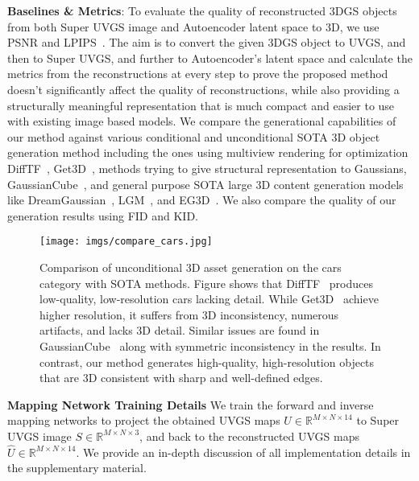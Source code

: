 \vspace{-0.1cm}
\noindent\textbf{Baselines \& Metrics}: 
To evaluate the quality of reconstructed 3DGS objects from both Super UVGS image and Autoencoder latent space to 3D, we use PSNR and LPIPS~\cite{lpips2018}. 
The aim is to convert the given 3DGS object to UVGS, and then to Super UVGS, and further to Autoencoder's latent space and calculate the metrics from the reconstructions at every step to prove the proposed method doesn't significantly affect the quality of reconstructions, while also providing a structurally meaningful representation that is much compact and easier to use with existing image based models. 
%
We compare the generational capabilities of our method against various conditional and unconditional SOTA 3D object generation method including the ones using multiview rendering for optimization DiffTF~\cite{difftf2023}, Get3D~\cite{get3d2022}, methods trying to give structural representation to Gaussians, GaussianCube~\cite{gaussiancube2024}, and general purpose SOTA large 3D content generation models like 
 DreamGaussian~\cite{dreamgaussian2023}, LGM~\cite{lgm2025}, and EG3D~\cite{eg3d2022}. 
We also compare the quality of our generation results using FID and KID.


\begin{figure*}[t]
\centering
\texttt{[image: imgs/compare\_cars.jpg]} 
\vspace{-0.4cm}
\caption{
Comparison of unconditional 3D asset generation on the cars category with SOTA methods. Figure shows that DiffTF~\cite{difftf2023} produces low-quality, low-resolution cars lacking detail. While Get3D~\cite{get3d2022} achieve higher resolution, it suffers from 3D inconsistency, numerous artifacts, and lacks 3D detail. Similar issues are found in GaussianCube~\cite{gaussiancube2024} along with symmetric inconsistency in the results. In contrast, our method generates high-quality, high-resolution objects that are 3D consistent with sharp and well-defined edges.
}
\vspace{-0.4cm}
\label{fig:compare_cars}
\end{figure*}


\noindent\textbf{Mapping Network Training Details}
We train the forward and inverse mapping networks to project the obtained UVGS maps $U \in \mathbb{R}^{M\times N \times14}$ to Super UVGS image $S \in \mathbb{R}^{M\times N \times 3}$, and back to the reconstructed UVGS maps $\hat{U} \in \mathbb{R}^{M\times N \times14}$. We provide an in-depth discussion of all implementation details in the supplementary material. 

